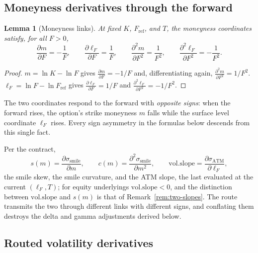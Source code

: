 \documentclass[11pt]{book}
\theoremstyle{plain}
\newtheorem{lemma}[theorem]{Lemma}
\theoremstyle{definition}
\theoremstyle{remark}
\newcommand{\mln}{m}                             %
\newcommand{\lF}{\ell_F}                         %
\newcommand{\Fref}{F_{\mathrm{ref}}}             %
\newcommand{\ssm}{\sigma_{\mathrm{smile}}}       %
\newcommand{\satm}{\sigma_{\mathrm{ATM}}}        %
\newcommand{\volslope}{\mathrm{vol.slope}}       %
\newcommand{\pd}[2]{\frac{\partial #1}{\partial #2}}          %
\newcommand{\pdd}[2]{\frac{\partial^2 #1}{\partial #2^2}}     %
\begin{document}
\subsection{Moneyness derivatives through the forward}\label{sec:spine:moneyness}

\begin{lemma}[Moneyness links]\label{lem:spine:moneyness}
At fixed $K$, $\Fref$, and $T$, the moneyness coordinates satisfy, for all
$F > 0$,
\begin{equation}\label{eq:spine:moneyness-links}
  \pd{\mln}{F} = -\frac{1}{F}, \qquad
  \pd{\lF}{F} = \frac{1}{F}, \qquad
  \pdd{\mln}{F} = \frac{1}{F^2}, \qquad
  \pdd{\lF}{F} = -\frac{1}{F^2}.
\end{equation}
\end{lemma}

\begin{proof}
$\mln = \ln K - \ln F$ gives $\pd{\mln}{F} = -1/F$ and, differentiating again,
$\pdd{\mln}{F} = 1/F^2$. $\lF = \ln F - \ln \Fref$ gives $\pd{\lF}{F} = 1/F$
and $\pdd{\lF}{F} = -1/F^2$.
\end{proof}

The two coordinates respond to the forward with \emph{opposite signs}: when
the forward rises, the option's strike moneyness $\mln$ falls while the
surface level coordinate $\lF$ rises. Every sign asymmetry in the formulas
below descends from this single fact.

Per the contract,
\[
  s(\mln) = \pd{\ssm}{\mln}, \qquad
  c(\mln) = \pdd{\ssm}{\mln}, \qquad
  \volslope = \pd{\satm}{\lF},
\]
the smile skew, the smile curvature, and the ATM slope, the last evaluated at
the current $(\lF, T)$; for equity underlyings $\volslope < 0$, and the
distinction between $\volslope$ and $s(\mln)$ is that of
Remark~\ref{rem:two-slopes}. The route transmits the two through different
links with different signs, and conflating them destroys the delta and gamma
adjustments derived below.

\subsection{Routed volatility derivatives}\label{sec:spine:vol-derivatives}
\end{document}
